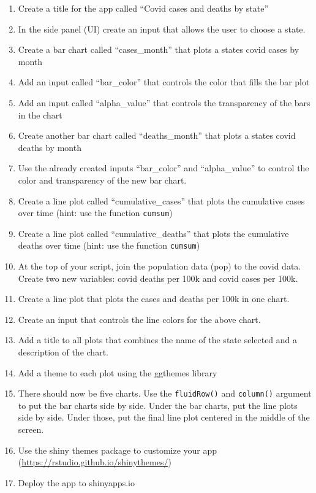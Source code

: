 \documentclass[
]{book}
\begin{document}
\begin{enumerate}
\def\labelenumi{\arabic{enumi})}
\setcounter{enumi}{4}
\item
  Create a title for the app called ``Covid cases and deaths by state''
\item
  In the side panel (UI) create an input that allows the user to choose a state.
\item
  Create a bar chart called ``cases\_month'' that plots a states covid cases by month
\item
  Add an input called ``bar\_color'' that controls the color that fills the bar plot
\item
  Add an input called ``alpha\_value'' that controls the transparency of the bars in the chart
\item
  Create another bar chart called ``deaths\_month'' that plots a states covid deaths by month
\item
  Use the already created inputs ``bar\_color'' and ``alpha\_value'' to control the color and transparency of the new bar chart.
\item
  Create a line plot called ``cumulative\_cases'' that plots the cumulative cases over time (hint: use the function \texttt{cumsum})
\item
  Create a line plot called ``cumulative\_deaths'' that plots the cumulative deaths over time (hint: use the function \texttt{cumsum})
\item
  At the top of your script, join the population data (pop) to the covid data. Create two new variables: covid deaths per 100k and covid cases per 100k.
\item
  Create a line plot that plots the cases and deaths per 100k in one chart.
\item
  Create an input that controls the line colors for the above chart.
\item
  Add a title to all plots that combines the name of the state selected and a description of the chart.
\item
  Add a theme to each plot using the ggthemes library
\item
  There should now be five charts. Use the \texttt{fluidRow()} and \texttt{column()} argument to put the bar charts side by side. Under the bar charts, put the line plots side by side. Under those, put the final line plot centered in the middle of the screen.
\item
  Use the shiny themes package to customize your app (\url{https://rstudio.github.io/shinythemes/})
\item
  Deploy the app to shinyapps.io
\end{enumerate}
\end{document}
